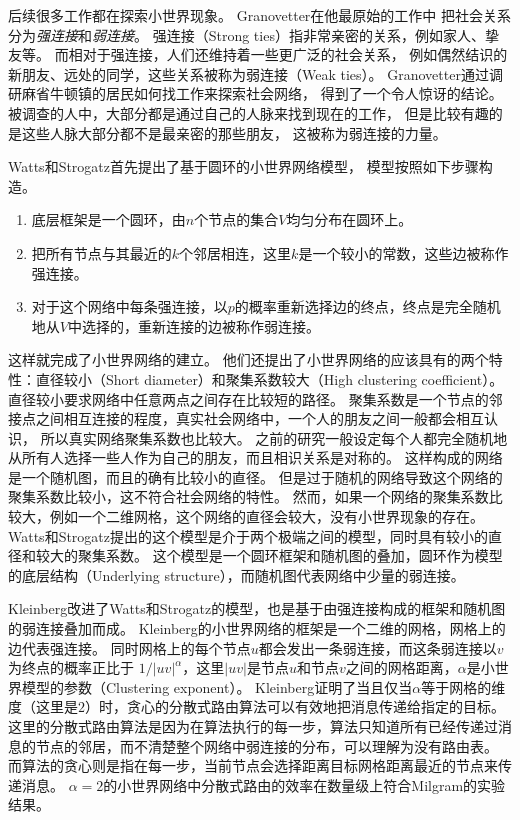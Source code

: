 后续很多工作都在探索小世界现象。
Granovetter在他最原始的工作中\cite{Granovetter1973strength,Granovetter1974getting}
把社会关系分为{\it 强连接}和{\it 弱连接}。
强连接（Strong ties）指非常亲密的关系，例如家人、挚友等。
而相对于强连接，人们还维持着一些更广泛的社会关系，
例如偶然结识的新朋友、远处的同学，这些关系被称为弱连接（Weak ties）。
Granovetter通过调研麻省牛顿镇的居民如何找工作来探索社会网络\cite{Granovetter1974getting}，
得到了一个令人惊讶的结论。
被调查的人中，大部分都是通过自己的人脉来找到现在的工作，
但是比较有趣的是这些人脉大部分都不是最亲密的那些朋友，
这被称为弱连接的力量\cite{Granovetter1973strength}。

Watts和Strogatz首先提出了基于圆环的小世界网络模型\cite{Watts1998collective}，
模型按照如下步骤构造。
\begin{enumerate}
	\item 底层框架是一个圆环，由$n$个节点的集合$V$均匀分布在圆环上。
	\item 把所有节点与其最近的$k$个邻居相连，这里$k$是一个较小的常数，这些边被称作强连接。
	\item 对于这个网络中每条强连接，以$p$的概率重新选择边的终点，终点是完全随机地从$V$中选择的，重新连接的边被称作弱连接。
\end{enumerate}
这样就完成了小世界网络的建立。
他们还提出了小世界网络的应该具有的两个特性：直径较小（Short diameter）和聚集系数较大（High clustering coefficient）。
直径较小要求网络中任意两点之间存在比较短的路径。
聚集系数是一个节点的邻接点之间相互连接的程度，真实社会网络中，一个人的朋友之间一般都会相互认识，
所以真实网络聚集系数也比较大。
之前的研究\cite{de1978contacts}一般设定每个人都完全随机地从所有人选择一些人作为自己的朋友，而且相识关系是对称的。
这样构成的网络是一个随机图，而且的确有比较小的直径\cite{bollobas1998random}。
但是过于随机的网络导致这个网络的聚集系数比较小，这不符合社会网络的特性。
然而，如果一个网络的聚集系数比较大，例如一个二维网格，这个网络的直径会较大，没有小世界现象的存在。
Watts和Strogatz提出的这个模型是介于两个极端之间的模型，同时具有较小的直径和较大的聚集系数。
这个模型是一个圆环框架和随机图的叠加，圆环作为模型的底层结构（Underlying structure），而随机图代表网络中少量的弱连接。

Kleinberg改进了Watts和Strogatz的模型\cite{Kleinberg2000small}，也是基于由强连接构成的框架和随机图的弱连接叠加而成。
Kleinberg的小世界网络的框架是一个二维的网格，网格上的边代表强连接。
同时网格上的每个节点$u$都会发出一条弱连接，而这条弱连接以$v$为终点的概率正比于
$1/|uv|^{\alpha}$，这里$|uv|$是节点$u$和节点$v$之间的网格距离，$\alpha$是小世界模型的参数（Clustering exponent）。
Kleinberg证明了当且仅当$\alpha$等于网格的维度（这里是$2$）时，贪心的分散式路由算法可以有效地把消息传递给指定的目标\cite{Kleinberg2000small}。
这里的分散式路由算法是因为在算法执行的每一步，算法只知道所有已经传递过消息的节点的邻居，而不清楚整个网络中弱连接的分布，可以理解为没有路由表。
而算法的贪心则是指在每一步，当前节点会选择距离目标网格距离最近的节点来传递消息。
$\alpha=2$的小世界网络中分散式路由的效率在数量级上符合Milgram的实验结果。



